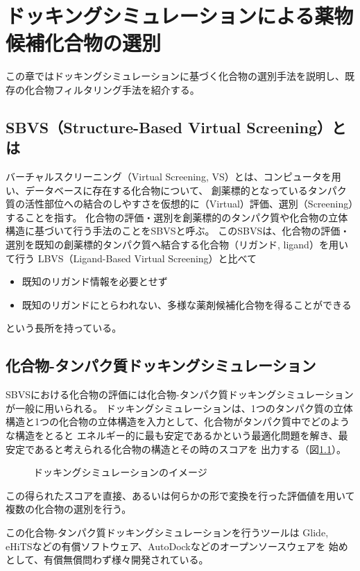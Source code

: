 \chapter{ドッキングシミュレーションによる薬物候補化合物の選別}
この章ではドッキングシミュレーションに基づく化合物の選別手法を説明し、既存の化合物フィルタリング手法を紹介する。

\section{SBVS（Structure-Based Virtual Screening）とは}
バーチャルスクリーニング（Virtual Screening, VS）とは、コンピュータを用い、データベースに存在する化合物について、
創薬標的となっているタンパク質の活性部位への結合のしやすさを仮想的に（Virtual）評価、選別（Screening）することを指す。
化合物の評価・選別を創薬標的のタンパク質や化合物の立体構造に基づいて行う手法のことをSBVSと呼ぶ。
このSBVSは、化合物の評価・選別を既知の創薬標的タンパク質へ結合する化合物（リガンド, ligand）を用いて行う
LBVS（Ligand-Based Virtual Screening）と比べて
\begin{itemize}
\item 既知のリガンド情報を必要とせず
\item 既知のリガンドにとらわれない、多様な薬剤候補化合物を得ることができる
\end{itemize}
という長所を持っている。

\section{化合物-タンパク質ドッキングシミュレーション}
SBVSにおける化合物の評価には化合物-タンパク質ドッキングシミュレーションが一般に用いられる。
ドッキングシミュレーションは、1つのタンパク質の立体構造と1つの化合物の立体構造を入力として、化合物がタンパク質中でどのような構造をとると
エネルギー的に最も安定であるかという最適化問題を解き、最安定であると考えられる化合物の構造とその時のスコアを
出力する（図\ref{fig:docking}）。
\begin{figure}[tb]
 \begin{center}
  \caption{ドッキングシミュレーションのイメージ}
  \label{fig:docking}
 \end{center}
\end{figure}
この得られたスコアを直接、あるいは何らかの形で変換を行った評価値を用いて複数の化合物の選別を行う。

この化合物-タンパク質ドッキングシミュレーションを行うツールは
Glide\cite{Friesner2004}, eHiTS\cite{Zsoldos2007}などの有償ソフトウェア、AutoDock\cite{Morris2009}などのオープンソースウェアを
始めとして、有償無償問わず様々開発されている。

